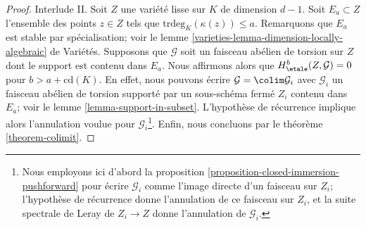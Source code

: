 \begin{proof}
\medskip\noindent
Interlude II. Soit $Z$ une variété lisse sur $K$ de dimension $d - 1$.
Soit $E_a \subset Z$ l'ensemble des points $z \in Z$ tels que
$\text{trdeg}_K(\kappa(z)) \leq a$. Remarquons que $E_a$ est stable
par spécialisation; voir le
lemme \ref{varieties-lemma-dimension-locally-algebraic} de Variétés.
Supposons que $\mathcal{G}$ soit un faisceau abélien de torsion sur $Z$
dont le support est contenu dans $E_a$. Nous affirmons alors que
$H^b_\etale(Z, \mathcal{G}) = 0$ pour $b > a + \text{cd}(K)$.
En effet, nous pouvons écrire $\mathcal{G} = \colim \mathcal{G}_i$
avec $\mathcal{G}_i$ un faisceau abélien de torsion
supporté par un sous-schéma fermé $Z_i$ contenu dans $E_a$; voir le
lemme \ref{lemma-support-in-subset}.
L'hypothèse de récurrence implique alors
l'annulation voulue pour $\mathcal{G}_i$\footnote{Nous employons ici d'abord la
proposition \ref{proposition-closed-immersion-pushforward}
pour écrire $\mathcal{G}_i$ comme l'image directe d'un faisceau sur $Z_i$;
l'hypothèse de récurrence donne l'annulation de ce faisceau sur $Z_i$, et
la suite spectrale de Leray de $Z_i \to Z$ donne l'annulation
de $\mathcal{G}_i$.}. Enfin, nous
concluons par le théorème \ref{theorem-colimit}.


\end{proof}
